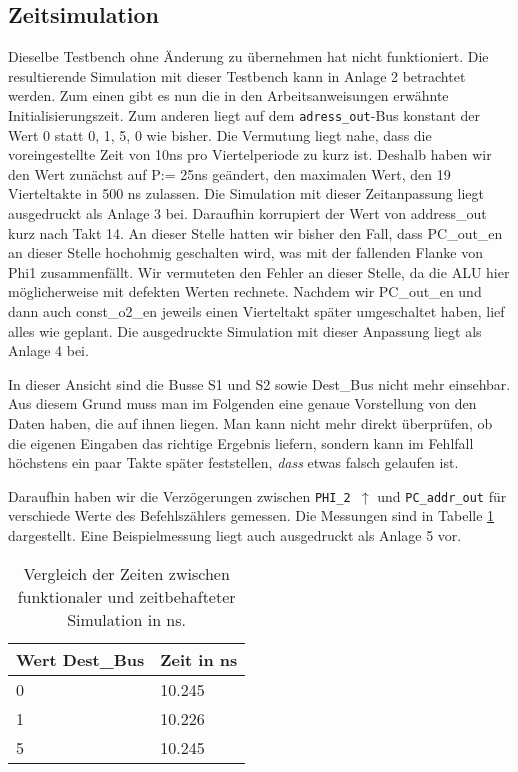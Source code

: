 \documentclass[12pt,a4paper]{scrartcl}
\begin{document}
\subsection{Zeitsimulation}
Dieselbe Testbench ohne \"Anderung zu \"ubernehmen hat nicht funktioniert. Die resultierende Simulation mit dieser Testbench kann in Anlage 2 betrachtet werden.
Zum einen gibt es nun die in den Arbeitsanweisungen erw\"ahnte Initialisierungszeit.
Zum anderen liegt auf dem \texttt{adress\_out}-Bus konstant der Wert 0 statt 0, 1, 5, 0 wie bisher.
Die Vermutung liegt nahe, dass die voreingestellte Zeit von 10ns pro Viertelperiode zu kurz ist.
Deshalb haben wir den Wert zun\"achst auf P:= 25ns ge\"andert, den maximalen Wert, den 19 Vierteltakte in 500 ns zulassen. Die Simulation mit dieser Zeitanpassung liegt ausgedruckt als Anlage 3 bei.
Daraufhin korrupiert der Wert von address\_out kurz nach Takt 14.
An dieser Stelle hatten wir bisher den Fall, dass PC\_out\_en an dieser Stelle hochohmig geschalten wird, was mit der fallenden Flanke von Phi1 zusammenf\"allt.
Wir vermuteten den Fehler an dieser Stelle, da die ALU hier m\"oglicherweise mit defekten Werten rechnete.
Nachdem wir PC\_out\_en und dann auch const\_o2\_en jeweils einen Vierteltakt sp\"ater umgeschaltet haben, lief alles wie geplant. Die ausgedruckte Simulation mit dieser Anpassung liegt als Anlage 4 bei.

In dieser Ansicht sind die Busse S1 und S2 sowie Dest\_Bus nicht mehr einsehbar.
Aus diesem Grund muss man im Folgenden eine genaue Vorstellung von den Daten haben, die auf ihnen liegen.
Man kann nicht mehr direkt \"uberpr\"ufen, ob die eigenen Eingaben das richtige Ergebnis liefern, sondern kann im Fehlfall h\"ochstens ein paar Takte sp\"ater feststellen, \emph{dass} etwas falsch gelaufen ist.

Daraufhin haben wir die Verz\"ogerungen zwischen \texttt{PHI\_2 $\uparrow$} und \texttt{PC\_addr\_out} f\"ur verschiede Werte des Befehlsz\"ahlers gemessen. Die Messungen sind in Tabelle \ref{vergleich} dargestellt. Eine Beispielmessung liegt auch ausgedruckt als Anlage 5 vor.


\begin{table}[h]
    \centering
    \begin{tabular}{l|l}
    \hline
    Wert Dest\_Bus & Zeit in ns \\
    \hline
    0              & 10.245     \\ %
    1              & 10.226     \\ %
    5              & 10.245     \\ %
    \hline
    \end{tabular}
    \caption{Vergleich der Zeiten zwischen funktionaler und zeitbehafteter Simulation in ns.}
    \label{vergleich}
\end{table}
\end{document}
